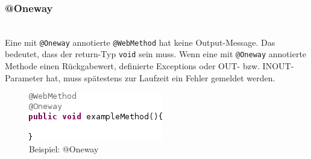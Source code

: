 \documentclass[runningheads]{llncs}
\begin{document}
    \subsubsection{@Oneway}\ \\
      Eine mit \texttt{@Oneway} annotierte \texttt{@WebMethod} hat keine Output-Message. Das bedeutet, dass der return-Typ \texttt{void} sein muss. Wenn eine mit \texttt{@Oneway} annotierte Methode einen Rückgabewert, definierte Exceptions oder OUT- bzw. INOUT-Parameter hat, muss spätestens zur Laufzeit ein Fehler gemeldet werden. \vfill
    \begin{figure}[tbh]
      \centering
      \includegraphics{../images/AtOneway.png}
      \caption{Beispiel: @Oneway}
      \label{fig:oneway}
    \end{figure}
\end{document}
